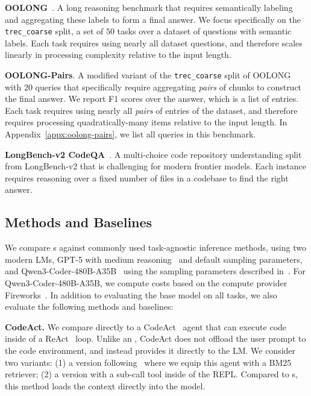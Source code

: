 \textbf{OOLONG}~\citep{bertsch2025oolongevaluatinglongcontext}. A long reasoning benchmark that requires semantically labeling and aggregating these labels to form a final answer. We focus specifically on the \texttt{trec\_coarse} split, a set of $50$ tasks over a dataset of questions with semantic labels. Each task requires using nearly all dataset questions, and therefore scales linearly in processing complexity relative to the input length. %

\textbf{OOLONG-Pairs}. A modified variant of the \texttt{trec\_coarse} split of OOLONG with $20$ queries that specifically require aggregating \textit{pairs} of chunks to construct the final answer. We report F1 scores over the answer, which is a list of entries. Each task requires using nearly all \textit{pairs} of entries of the dataset, and therefore requires processing quadratically-many items relative to the input length. In Appendix~\ref{appx:oolong-pairs}, we list all queries in this benchmark.


\textbf{LongBench-v2 CodeQA}~\citep{bai2025longbenchv2deeperunderstanding}. A multi-choice code repository understanding split from LongBench-v2 that is challenging for modern frontier models. Each instance requires reasoning over a fixed number of files in a codebase to find the right answer.

\subsection{Methods and Baselines} \label{sec4.2-methods}
We compare \RLM{}s against commonly used task-agnostic inference methods, using two modern LMs, GPT-5 with medium reasoning~\citep{singh2025openaigpt5card} and default sampling parameters, and Qwen3-Coder-480B-A35B~\citep{yang2025qwen3technicalreport} using the sampling parameters described in~\citet{Qwen3-Coder-480B-A35B}. For Qwen3-Coder-480B-A35B, we compute costs based on the compute provider Fireworks~\citep{Qwen3-Coder-Fireworks}. In addition to evaluating the base model on all tasks, we also evaluate the following methods and baselines:

\textbf{CodeAct.} We compare directly to a  CodeAct~\citep{wang2024executablecodeactionselicit} agent that can execute code inside of a ReAct~\citep{yao2023reactsynergizingreasoningacting} loop. Unlike an \RLM, CodeAct does not offload the user prompt to the code environment, and instead provides it directly to the LM. We consider two variants: (1) a version following~\citet{jimenez2024swebenchlanguagemodelsresolve, chen2025browsecompplusfairtransparentevaluation} where we equip this agent with a BM25~\citep{10.1561/1500000019} retriever; (2) a version with a sub-call tool inside of the REPL. Compared to \RLM{}s, this method loads the context directly into the model.



